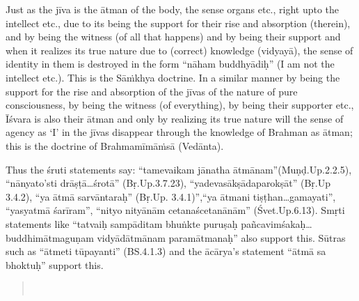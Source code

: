 Just as the jīva is the ātman of the body, the sense organs etc., right upto the intellect etc., due to its being the support for their rise and absorption (therein), and by being the witness (of all that happens) and by being their support and when it realizes its true nature due to (correct) knowledge (vidyayā), the sense of identity in them is destroyed in the form “nāham buddhyādiḥ” (I am not the intellect etc.). This is the Sāṁkhya doctrine. In a similar manner by being the support for the rise and absorption of the jīvas of the nature of pure consciousness, by being the witness (of everything), by being their supporter etc., Īśvara is also their ātman and only by realizing its true nature will the sense of agency as ‘I’ in the jīvas disappear through the knowledge of Brahman as ātman; this is the doctrine of Brahmamīmāṁsā (Vedānta).

Thus the śruti statements say: “tamevaikam jānatha ātmānam”\break (Muṇḍ.Up.2.2.5), “nānyato’sti drāṣṭā…śrotā” (Bṛ.Up.3.7.23), “yadeva\break sākṣādaparokṣāt” (Bṛ.Up 3.4.2), ``ya ātmā sarvāntaraḥ” (Bṛ.Up. 3.4.1)”,\break ``ya ātmani tiṣṭhan…gamayati”, “yasyatmā śarīram”, “nityo nityānām cetanaścetanānām” (Śvet.Up.6.13). Smṛti statements like “tatvaiḥ sampāditam bhuṅkte puruṣaḥ pañcavimśakaḥ…buddhimātmaguṇam vidyādātmānam paramātmanaḥ” also support this. Sūtras such as “ātmeti tūpayanti” (BS.4.1.3) and the ācārya’s statement “ātmā sa bhoktuḥ” support this. 

\begin{verse}
\\
\end{verse}

